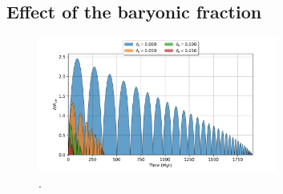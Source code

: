 	\subsection{Effect of the baryonic fraction}
	\begin{figure}[h]
		\centering
		\includegraphics[width = 0.7\textwidth]{"../Files/Week 5/baryonic_fraction_comparison"}
		\caption{.}
		\label{fig: baryonicfraction}
	\end{figure}
		
